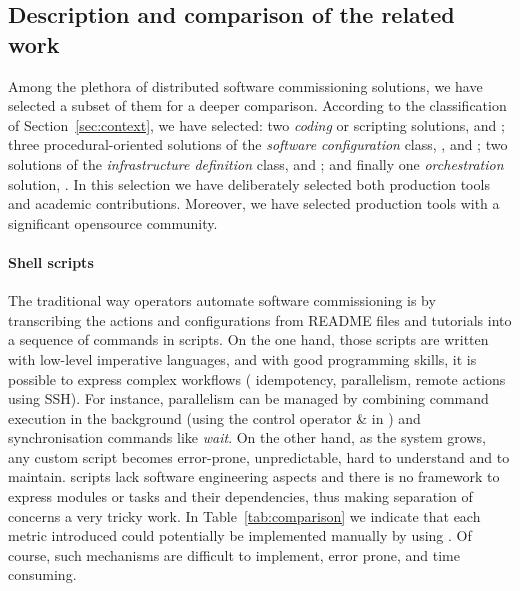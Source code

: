 \subsection{Description and comparison of the related work}

Among the plethora of distributed software commissioning solutions, we
have selected a subset of them for a deeper comparison. According to
the classification of Section~\ref{sec:context}, we have selected: two
\emph{coding} or scripting solutions, \shell and \fractal; three
procedural-oriented solutions of the \emph{software configuration}
class, \ansible, \deployware and \aeolus; two solutions of the
\emph{infrastructure definition} class, \juju and \tosca; and finally
one \emph{orchestration} solution, \kubernetes. In this selection we
have deliberately selected both production tools and
academic contributions. Moreover, we have selected production tools
with a significant opensource community.

\paragraph{Shell scripts}
The traditional way operators automate software commissioning is by
transcribing the actions and configurations from README files and tutorials
into a sequence of commands in \shell scripts. On the one hand, those
scripts are written with low-level imperative languages, and with good
programming skills, it is possible to express complex workflows (\eg
idempotency, parallelism, remote actions using SSH). For
instance, parallelism can be managed by combining command execution in
the background (\eg using the control operator \& in \bash) and
synchronisation commands like \emph{wait}. On the other hand, as the
system grows, any custom script becomes error-prone, unpredictable,
hard to understand and to maintain. \shell scripts lack software
engineering aspects and there is no framework to express modules or
tasks and their dependencies, thus making separation of concerns a very
tricky work. In Table~\ref{tab:comparison} we indicate that each
metric introduced could potentially be implemented manually by using
\shell. Of course, such mechanisms are difficult to implement, error
prone, and time consuming.

